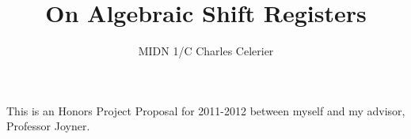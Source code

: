 \documentclass[english]{article}
\theoremstyle{plain}
\theoremstyle{definition}
\theoremstyle{remark}
\begin{document}
\title{On Algebraic Shift Registers}
\author{MIDN 1/C Charles Celerier}

\maketitle



\par This is an Honors Project Proposal for 2011-2012 between
myself and my advisor, Professor Joyner.

 


%





\end{document}
